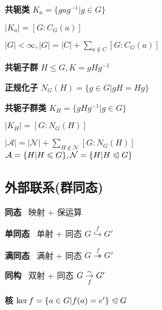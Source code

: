 \documentclass[a4paper,10pt]{ctexart}
\renewcommand*{\leq}{\leqslant}
\newcommand*{\nmsubgroupeq}{\trianglelefteqslant}
\begin{document}
\begin{multicols}{3}
    \textbf{共轭类} $K_a = \{ gag^{-1} | g \in G \}$

    \begin{theorem}[共轭子群基数定理]
        $|K_a| = [G:C_G(a)]$
    \end{theorem}

    \begin{theorem}[类方程]
        $|G| \! < \! \infty, |G| \! = \! |C| + \sum\limits_{a \notin C} [G:C_G(a)]$
    \end{theorem}

    \textbf{共轭子群} $H \leq G, K = gHg^{-1}$

    \textbf{正规化子} $N_G(H) = \{g \in G | gH = Hg\}$

    \textbf{共轭子群类} $K_H = \{gHg^{-1} | g \in G\}$

    \begin{theorem}[共轭子群类基数定理]
        $|K_H| \!\! = \!\! [G:N_G(H)]$
    \end{theorem}

    \begin{theorem}[类方程2]
        $|\mathcal{A}| = |\mathcal{N}| + \sum\limits_{H \notin \mathcal{N}} [G:N_G(H)]$ \\
        $\mathcal{A} = \{ H | H \leq G \}, \mathcal{N} = \{ H | H \nmsubgroupeq G \}$
    \end{theorem}

    \subsection{外部联系(群同态)} \label{sec:group-homomorphism}

    \textbf{同态} \ 映射 + 保运算

    \textbf{单同态} \ 单射 + 同态 $G \overset{f}{\hookrightarrow} G'$

    \textbf{满同态} \ 满射 + 同态 $G \overset{f}{\twoheadrightarrow} G'$

    \textbf{同构} \ 双射 + 同态 $G \overunderset{\sim}{f}{\rightarrow} G'$

    \textbf{核} $\ker f = \{ a \in G | f(a) = e' \} \nmsubgroupeq G$

    \begin{theorem}[同态性质]
        \hfil


\end{theorem}
\end{multicols}
\end{document}
